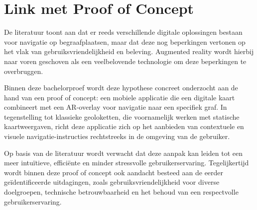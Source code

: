 \section{Link met Proof of Concept}

De literatuur toont aan dat er reeds verschillende digitale oplossingen bestaan voor navigatie op begraafplaatsen, maar dat deze nog beperkingen vertonen op het vlak van gebruiksvriendelijkheid en beleving. Augmented reality wordt hierbij naar voren geschoven als een veelbelovende technologie om deze beperkingen te overbruggen.

Binnen deze bachelorproef wordt deze hypothese concreet onderzocht aan de hand van een proof of concept: een mobiele applicatie die een digitale kaart combineert met een AR-overlay voor navigatie naar een specifiek graf. In tegenstelling tot klassieke geoloketten, die voornamelijk werken met statische kaartweergaven, richt deze applicatie zich op het aanbieden van contextuele en visuele navigatie-instructies rechtstreeks in de omgeving van de gebruiker.

Op basis van de literatuur wordt verwacht dat deze aanpak kan leiden tot een meer intuïtieve, efficiënte en minder stressvolle gebruikerservaring. Tegelijkertijd wordt binnen deze proof of concept ook aandacht besteed aan de eerder geïdentificeerde uitdagingen, zoals gebruiksvriendelijkheid voor diverse doelgroepen, technische betrouwbaarheid en het behoud van een respectvolle gebruikerservaring.





